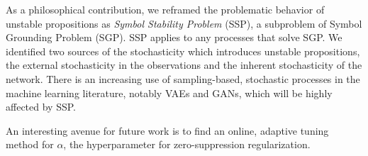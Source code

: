 As a philosophical contribution,
we reframed the problematic behavior of unstable propositions
as \emph{Symbol Stability Problem} (SSP), a subproblem of Symbol Grounding Problem (SGP).
SSP applies to any processes that solve SGP.
% 
We identified two sources of the stochasticity which introduces unstable propositions,
the external stochasticity in the observations and the inherent stochasticity of the network.
There is an increasing use of sampling-based, stochastic processes in
the machine learning literature, notably VAEs and GANs,
which will be highly affected by SSP.

An interesting avenue for future work is to 
find an online, adaptive tuning method for $\alpha$, the hyperparameter for
zero-suppression regularization.
